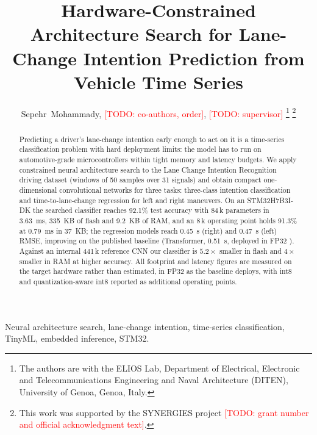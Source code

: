 \documentclass[journal]{IEEEtran}
\newcommand{\todo}[1]{\textcolor{red}{[TODO: #1]}}
\begin{document}
\title{Hardware-Constrained Architecture Search for Lane-Change Intention
Prediction from Vehicle Time Series}

\author{Sepehr~Mohammady,
        \todo{co-authors, order},
        \todo{supervisor}%
\thanks{The authors are with the ELIOS Lab, Department of Electrical,
Electronic and Telecommunications Engineering and Naval Architecture (DITEN),
University of Genoa, Genoa, Italy.}%
\thanks{This work was supported by the SYNERGIES project
\todo{grant number and official acknowledgment text}.}}

\maketitle

\begin{abstract}
Predicting a driver's lane-change intention early enough to act on it is a
time-series classification problem with hard deployment limits: the model has
to run on automotive-grade microcontrollers within tight memory and latency
budgets. We apply constrained neural architecture search to the Lane Change
Intention Recognition driving dataset \cite{lcdataset} (windows of 50 samples
over 31 signals) and obtain compact one-dimensional convolutional networks for
three tasks: three-class intention classification and time-to-lane-change
regression for left and right maneuvers. On an STM32H7B3I-DK the searched
classifier reaches 92.1\% test accuracy with 84\,k parameters in 3.63~ms,
335~KB of flash and 9.2~KB of RAM, and an 8\,k operating point holds 91.3\% at
0.79~ms in 37~KB; the regression models reach 0.45~s (right) and 0.47~s (left)
RMSE, improving on the published baseline (Transformer, 0.51~s, deployed in
FP32 \cite{lcintention2026}). Against an internal 441\,k reference CNN our
classifier is $5.2\times$ smaller in flash and $4\times$ smaller in RAM at
higher accuracy. All footprint and latency figures are measured on the target
hardware rather than estimated, in FP32 as the baseline deploys, with int8 and
quantization-aware int8 reported as additional operating points.
\end{abstract}

\begin{IEEEkeywords}
Neural architecture search, lane-change intention, time-series classification,
TinyML, embedded inference, STM32.
\end{IEEEkeywords}
\end{document}
